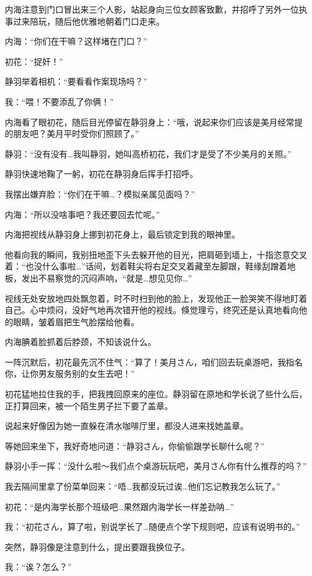 内海注意到门口冒出来三个人影，站起身向三位女顾客致歉，并招呼了另外一位执事过来陪玩，随后他优雅地朝着门口走来。

内海：“你们在干嘛？这样堵在门口？”

初花：“捉奸！”

静羽举着相机：“要看看作案现场吗？”

我：“喂！不要添乱了你俩！”

内海看了眼初花，随后目光停留在静羽身上：“哦，说起来你们应该是美月经常提的朋友吧？美月平时受你们照顾了。”

静羽：“没有没有…我叫静羽，她叫高桥初花，我们才是受了不少美月的关照。”

静羽快速地鞠了一躬，初花在静羽身后挥手打招呼。

我摆出嫌弃脸：“你们在干嘛…？模拟亲属见面吗？”

内海：“所以没啥事吧？我还要回去忙呢。”

内海把视线从静羽身上挪到初花身上，最后锁定到我的眼神里。

他看向我的瞬间，我别扭地歪下头去躲开他的目光，把肩砸到墙上，十指恣意交叉着：“也没什么事啦…”话间，划着鞋尖将右足交叉着藏至左脚跟，鞋缘刮蹭着地板，发出不易察觉的沉闷声响，“就是…想见见你…”

视线无处安放地四处飘忽着，时不时扫到他的脸上，发现他正一脸哭笑不得地盯着自己。心中烦闷，没好气地再次错开他的视线。倏觉理亏，终究还是认真地看向他的眼睛，皱着眉把生气脸摆给他看。

内海腆着脸抓着后脖颈，不知该说什么。

一阵沉默后，初花最先沉不住气：“算了！美月さん，咱们回去玩桌游吧，我指名你，让你男友服务别的女生去吧！”

初花猛地拉住我的手，把我拽回原来的座位。静羽留在原地和学长说了些什么后，正打算回来，被一个陌生男子拦下要了盖章。

说起来好像因为她一直躲在清水咖啡厅里，都没人进来找她盖章。

等她回来坐下，我好奇地问道：“静羽さん，你偷偷跟学长聊什么呢？”

静羽小手一挥：“没什么啦～我们点个桌游玩玩吧，美月さん你有什么推荐的吗？”

我去隔间里拿了份菜单回来：“唔…我都没玩过诶…他们忘记教我怎么玩了。”

初花：“是内海学长那个班级吧…果然跟内海学长一样差劲呐…”

我：“初花さん，算了啦，别说学长了…随便点个学下规则吧，应该有说明书的。”

突然，静羽像是注意到什么，提出要跟我换位子。

我：“诶？怎么？”

